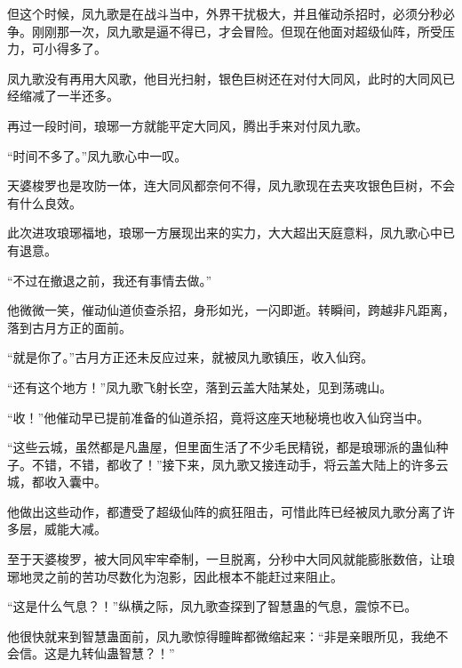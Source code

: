 \begin{this_body}
但这个时候，凤九歌是在战斗当中，外界干扰极大，并且催动杀招时，必须分秒必争。刚刚那一次，凤九歌是逼不得已，才会冒险。但现在他面对超级仙阵，所受压力，可小得多了。

凤九歌没有再用大风歌，他目光扫射，银色巨树还在对付大同风，此时的大同风已经缩减了一半还多。

再过一段时间，琅琊一方就能平定大同风，腾出手来对付凤九歌。

“时间不多了。”凤九歌心中一叹。

天婆梭罗也是攻防一体，连大同风都奈何不得，凤九歌现在去夹攻银色巨树，不会有什么良效。

此次进攻琅琊福地，琅琊一方展现出来的实力，大大超出天庭意料，凤九歌心中已有退意。

“不过在撤退之前，我还有事情去做。”

他微微一笑，催动仙道侦查杀招，身形如光，一闪即逝。转瞬间，跨越非凡距离，落到古月方正的面前。

“就是你了。”古月方正还未反应过来，就被凤九歌镇压，收入仙窍。

“还有这个地方！”凤九歌飞射长空，落到云盖大陆某处，见到荡魂山。

“收！”他催动早已提前准备的仙道杀招，竟将这座天地秘境也收入仙窍当中。

“这些云城，虽然都是凡蛊屋，但里面生活了不少毛民精锐，都是琅琊派的蛊仙种子。不错，不错，都收了！”接下来，凤九歌又接连动手，将云盖大陆上的许多云城，都收入囊中。

他做出这些动作，都遭受了超级仙阵的疯狂阻击，可惜此阵已经被凤九歌分离了许多层，威能大减。

至于天婆梭罗，被大同风牢牢牵制，一旦脱离，分秒中大同风就能膨胀数倍，让琅琊地灵之前的苦功尽数化为泡影，因此根本不能赶过来阻止。

“这是什么气息？！”纵横之际，凤九歌查探到了智慧蛊的气息，震惊不已。

他很快就来到智慧蛊面前，凤九歌惊得瞳眸都微缩起来：“非是亲眼所见，我绝不会信。这是九转仙蛊智慧？！”

\end{this_body}

